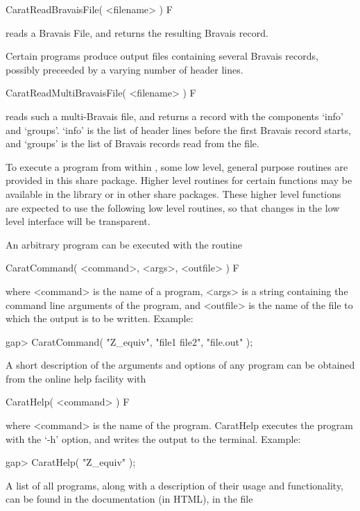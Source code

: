 \>CaratReadBravaisFile( <filename> ) F

reads a Bravais File, and returns the resulting Bravais record.

Certain {\CARAT} programs produce output files containing several Bravais 
records, possibly preceeded by a varying number of header lines.

\>CaratReadMultiBravaisFile( <filename> ) F

reads such a multi-Bravais file, and returns a record with the components
`info' and `groups'. `info' is the list of header lines before the first
Bravais record starts, and `groups' is the list of Bravais records read from
the file.


To execute a {\CARAT} program from within {\GAP}, some low level,
general purpose routines are provided in this share package. 
Higher level routines for certain {\CARAT} functions may be available 
in the {\GAP} library or in other share packages. These higher
level functions are expected to use the following low level routines,
so that changes in the low level interface will be transparent. 

An arbitrary {\CARAT} program can be executed with the routine

\>CaratCommand( <command>, <args>, <outfile> ) F

where <command> is the name of a {\CARAT} program, <args> is a string
containing the command line arguments of the {\CARAT} program,
and <outfile> is the name of the file to which the output is to be 
written. Example:

\begintt
gap> CaratCommand( "Z_equiv", "file1 file2", "file.out" );
\endtt

A short description of the arguments and options of any {\CARAT} 
program can be obtained from the {\CARAT} online help facility with

\>CaratHelp( <command> ) F

where <command> is the name of the {\CARAT} program. CaratHelp executes
the program with the `-h' option, and writes the output to the 
terminal. Example:

\begintt
gap> CaratHelp( "Z_equiv" );
\endtt

A list of all {\CARAT} programs, along with a description of their
usage and functionality, can be found in the {\CARAT} documentation 
(in HTML), in the file

